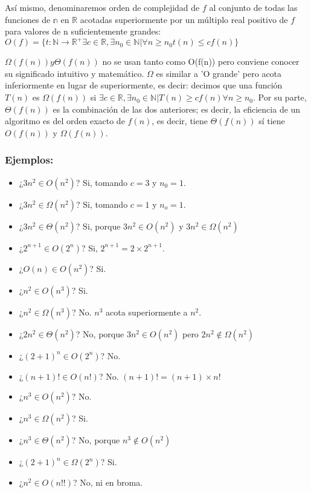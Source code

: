 \documentclass[a4paper, 11pt]{article}
\begin{document}
Así mismo, denominaremos orden de complejidad de $f$ al conjunto de todas las funciones de $\mathbb{n}$ en $\mathbb{R}$ acotadas superiormente por un múltiplo real positivo de $f$ para valores de n suficientemente grandes: $O(f)=\{t:\mathbb{N} \rightarrow \mathbb{R}^+ \exists c \in \mathbb{R}, \exists n_{0} \in \mathbb{N} |\forall n \geq n_{0} t(n) \leq cf(n)\} $ \pagebreak

$\Omega(f(n)) y \Theta(f(n))$ no se usan tanto como O(f(n)) pero conviene conocer su significado intuitivo y matemático. $\Omega$ es similar a 'O grande' pero acota inferiormente en lugar de superiormente, es decir: decimos que una función $T(n)$ es $\Omega(f(n))$ si $\exists c \in \mathbb{R}, \exists n_{0} \in \mathbb{N} | T(n) \geq cf(n) \forall n \geq n_{0}$. Por su parte, $\Theta(f(n))$ es la combinación de las dos anteriores; es decir, la eficiencia de un algoritmo es del orden exacto de $f(n)$, es decir, tiene $\Theta(f(n))$ sí tiene $O(f(n))$ y $\Omega(f(n))$. 

\subsubsection{Ejemplos:}
\begin{itemize}

\item ¿$3n^2 \in O(n^2)$? Si, tomando $c = 3$ y $n_0 = 1$. 
\item ¿$3n^2 \in \Omega(n^2)$?  Si, tomando $c = 1$ y $n_o = 1$.
\item ¿$3n^2 \in \Theta(n^2)$?  Si, porque $3n^2 \in O(n^2)$ y $3n^2 \in \Omega(n^2)$
\item ¿$2^{n+1} \in O(2^n)$?  Si, $2^{n+1} = 2\times2^{n+1}$.
\item ¿$O(n) \in O(n^2)$?  Si. 
\item ¿$n^2 \in O(n^3)$? Si. 
\item ¿$n^2 \in \Omega(n^3)$? No. $n^3$ acota superiormente a $n^2$. 
\item ¿$2n^2 \in \Theta(n^2)$?  No, porque $3n^2 \in O(n^2)$ pero $2n^2 \notin \Omega(n^2)$
\item ¿$(2+1)^n \in O(2^n)$? No. 
\item ¿$(n+1)! \in O(n!)$? No. $(n+1)! = (n+1)\times n!$ 
\item ¿$n^3 \in O(n^2)$? No. 
\item ¿$n^3 \in \Omega(n^2)$? Si.
\item ¿$n^3 \in \Theta(n^2)$? No, porque $n^3 \notin O(n^2)$
\item ¿$(2+1)^n \in \Omega(2^n)$? Si. 
\item ¿$n^2 \in O(n!!)$? No, ni en broma. 
\end{itemize}
\end{document}
